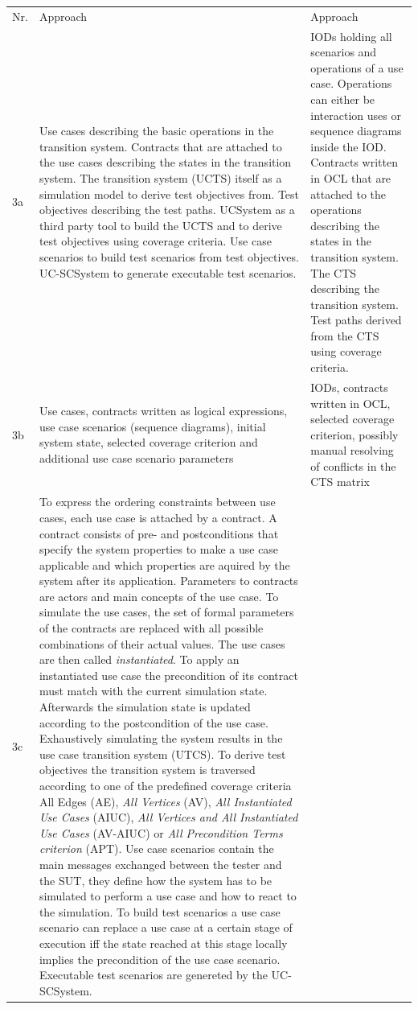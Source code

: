 \begin{longtable}[h]{p{0.5cm}p{}p{}}
	Nr. & Approach \cite{ansatz.2006} & Approach \cite{ansatz.2007} \\
	3a & 
	Use cases describing the basic operations in the transition system. Contracts that are attached to the use cases describing the states in the transition system. The transition system (UCTS) itself as a simulation model to derive test objectives from. Test objectives describing the test paths. UCSystem as a third party tool to build the UCTS and to derive test objectives using coverage criteria. Use case scenarios to build test scenarios from test objectives. UC-SCSystem to generate executable test scenarios.  & 
	IODs holding all scenarios and operations of a use case. Operations can either be interaction uses or sequence diagrams inside the IOD. Contracts written in OCL that are attached to the operations describing the states in the transition system. The CTS describing the transition system. Test paths derived from the CTS using coverage criteria.  \\
	3b & 
	Use cases, contracts written as logical expressions, use case scenarios (sequence diagrams), initial system state, selected coverage criterion and additional use case scenario parameters & 
	IODs, contracts written in OCL, selected coverage criterion, possibly manual resolving of conflicts in the CTS matrix \\
	3c &
	To express the ordering constraints between use cases, each use case is attached by a contract. A contract consists of pre- and postconditions that specify the system properties to make a use case applicable and which properties are aquired by the system after its application. Parameters to contracts are actors and main concepts of the use case. To simulate the use cases, the set of formal parameters of the contracts are replaced with all possible combinations of their actual values. The use cases are then called \textit{instantiated}. To apply an instantiated use case the precondition of its contract must match with the current simulation state. Afterwards the simulation state is updated according to the postcondition of the use case. Exhaustively simulating the system results in the use case transition system (UTCS). To derive test objectives the transition system is traversed according to one of the predefined coverage criteria {All Edges} (AE), \textit{All Vertices} (AV), \textit{All Instantiated Use Cases} (AIUC), \textit{All Vertices and All Instantiated Use Cases} (AV-AIUC) or \textit{All Precondition Terms criterion} (APT). Use case scenarios contain the main messages exchanged between the tester and the SUT, they define how the system has to be simulated to perform a use case and how to react to the simulation. To build test scenarios a use case scenario can replace a use case at a certain stage of execution iff the state reached at this stage locally implies the precondition of the use case scenario. Executable test scenarios are genereted by the UC-SCSystem. &

\end{longtable}
